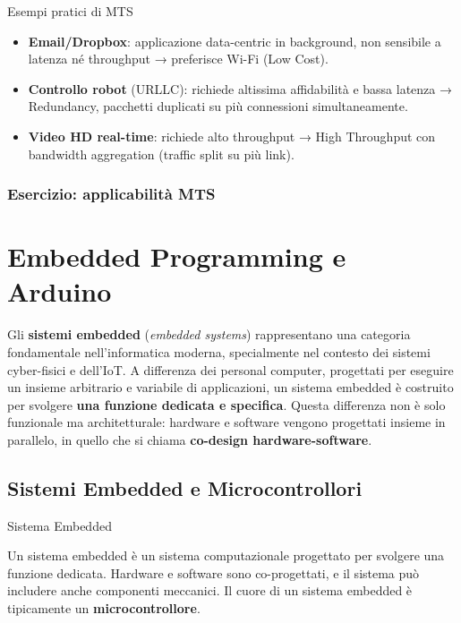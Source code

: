 \documentclass[
  italian,
  openany]{book}
\providecommand{\tightlist}{%
  \setlength{\itemsep}{0pt}\setlength{\parskip}{0pt}}
\begin{document}
\begin{callouttip}{Esempi pratici di MTS}

\begin{itemize}
\tightlist
\item
  \textbf{Email/Dropbox}: applicazione data-centric in background, non
  sensibile a latenza né throughput → preferisce Wi-Fi (Low Cost).
\item
  \textbf{Controllo robot} (URLLC): richiede altissima affidabilità e
  bassa latenza → Redundancy, pacchetti duplicati su più connessioni
  simultaneamente.
\item
  \textbf{Video HD real-time}: richiede alto throughput → High
  Throughput con bandwidth aggregation (traffic split su più link).
\end{itemize}

\end{callouttip}

\subsection{Esercizio: applicabilità
MTS}\label{esercizio-applicabilituxe0-mts}

\newpage

\chapter{Embedded Programming e
Arduino}\label{embedded-programming-e-arduino}

Gli \textbf{sistemi embedded} (\emph{embedded systems}) rappresentano
una categoria fondamentale nell'informatica moderna, specialmente nel
contesto dei sistemi cyber-fisici e dell'IoT. A differenza dei personal
computer, progettati per eseguire un insieme arbitrario e variabile di
applicazioni, un sistema embedded è costruito per svolgere \textbf{una
funzione dedicata e specifica}. Questa differenza non è solo funzionale
ma architetturale: hardware e software vengono progettati insieme in
parallelo, in quello che si chiama \textbf{co-design hardware-software}.

\section{Sistemi Embedded e
Microcontrollori}\label{sistemi-embedded-e-microcontrollori}

\begin{calloutdefinition}{Sistema Embedded}

Un sistema embedded è un sistema computazionale progettato per svolgere
una funzione dedicata. Hardware e software sono co-progettati, e il
sistema può includere anche componenti meccanici. Il cuore di un sistema
embedded è tipicamente un \textbf{microcontrollore}.

\end{calloutdefinition}
\end{document}
